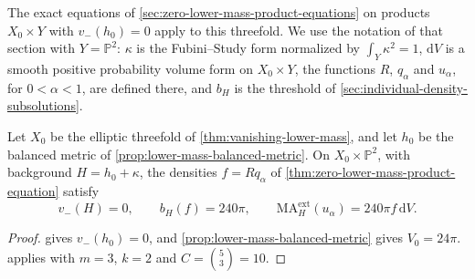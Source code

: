 The exact equations of \cref{sec:zero-lower-mass-product-equations} on products $X_0\times Y$ with $v_-(h_0)=0$ apply to this threefold. We use the notation of that section with $Y=\mathbb P^2$: $\kappa$ is the Fubini--Study form normalized by $\int_Y\kappa^2=1$, $\mathrm{d}V$ is a smooth positive probability volume form on $X_0\times Y$, the functions $R$, $q_\alpha$ and $u_\alpha$, for $0<\alpha<1$, are defined there, and $b_H$ is the threshold of \cref{sec:individual-density-subsolutions}.

\begin{corollary}\label{cor:elliptic-fivefold-exact-threshold}
Let $X_0$ be the elliptic threefold of \cref{thm:vanishing-lower-mass}, and let $h_0$ be the balanced metric of \cref{prop:lower-mass-balanced-metric}. On $X_0\times\mathbb P^2$, with background $H=h_0+\kappa$, the densities $f=Rq_\alpha$ of \cref{thm:zero-lower-mass-product-equation} satisfy
\[
 v_-(H)=0,\qquad b_H(f)=240\pi,
 \qquad\mathrm{MA}^{\mathrm{ext}}_H(u_\alpha)=240\pi f\,\mathrm{d}V.
\]
\end{corollary}
\begin{proof}
 gives $v_-(h_0)=0$, and \cref{prop:lower-mass-balanced-metric} gives $V_0=24\pi$.  applies with $m=3$, $k=2$ and $C=\binom53=10$.
\end{proof}
